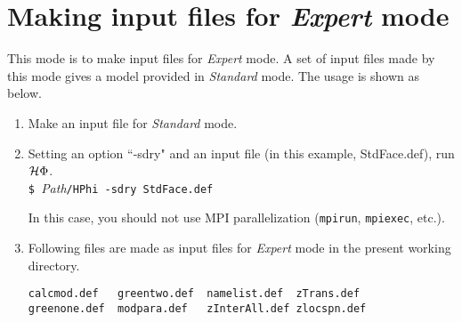 \section{Making input files for {\it Expert} mode}
This mode is to make input files for {\it Expert} mode. A set of input files made by this mode gives a model provided in {\it Standard} mode.
The usage is shown as below.
\begin{enumerate}
\item{Make an input file for {\it Standard} mode.}
\item{Setting an option ``-sdry" and an input file (in this example, StdFace.def), run $\mathcal{H} \Phi$.}\\
\verb|$ |\textit{Path}\verb|/HPhi -sdry StdFace.def|

In this case, you should not use MPI parallelization (\verb|mpirun|, \verb|mpiexec|, etc.).
\item{Following files are made as input files for {\it Expert} mode in the present working directory.}\\
\begin{minipage}{12cm}
\begin{screen}
\begin{verbatim}
calcmod.def   greentwo.def  namelist.def  zTrans.def
greenone.def  modpara.def   zInterAll.def zlocspn.def
\end{verbatim}
\end{screen}
\end{minipage}
\end{enumerate}

